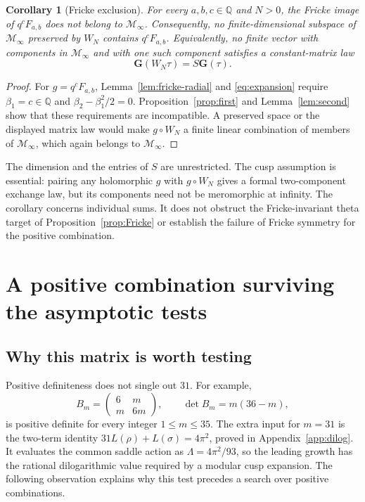 \documentclass[11pt,reqno]{amsart}
\newcommand{\QQ}{\mathbb Q}
\newtheorem{corollary}[theorem]{Corollary}
\theoremstyle{remark}
\numberwithin{equation}{section}
\begin{document}
\begin{corollary}[Fricke exclusion]\label{cor:fricke}
For every $a,b,c\in\QQ$ and $N>0$, the Fricke image of
$q^cF_{a,b}$ does not belong to $\mathcal M_\infty$.
Consequently, no finite-dimensional subspace of $\mathcal M_\infty$
preserved by $W_N$ contains $q^cF_{a,b}$. Equivalently, no finite vector
with components in $\mathcal M_\infty$ and with one such component
satisfies a constant-matrix law
\[
 \mathbf G(W_N\tau)=S\mathbf G(\tau).
\]
\end{corollary}
\begin{proof}
For $g=q^cF_{a,b}$, Lemma~\ref{lem:fricke-radial} and
\eqref{eq:expansion} require $\beta_1=c\in\QQ$ and
$\beta_2-\beta_1^2/2=0$. Proposition~\ref{prop:first} and
Lemma~\ref{lem:second} show that these requirements are incompatible.
A preserved space or the displayed matrix law would make
$g\circ W_N$ a finite linear combination of members of
$\mathcal M_\infty$, which again belongs to $\mathcal M_\infty$.
\end{proof}

The dimension and the entries of $S$ are unrestricted. The cusp
assumption is essential: pairing any holomorphic $g$ with
$g\circ W_N$ gives a formal two-component exchange law, but its
components need not be meromorphic at infinity. The corollary concerns
individual sums. It does not obstruct the Fricke-invariant theta
target of Proposition~\ref{prop:Fricke} or establish the failure of
Fricke symmetry for the positive combination.



\section{A positive combination surviving the asymptotic tests}
\label{sec:combination}
\subsection*{Why this matrix is worth testing}
Positive definiteness does not single out $31$. For example,
\[
 B_m=\begin{pmatrix}6&m\\m&6m\end{pmatrix},\qquad
 \det B_m=m(36-m),
\]
is positive definite for every integer $1\leq m\leq35$.
The extra input for $m=31$ is the two-term identity
$31L(\rho)+L(\sigma)=4\pi^2$, proved in Appendix~\ref{app:dilog}.
It evaluates the common saddle action as $\Lambda=4\pi^2/93$,
so the leading growth has the rational dilogarithmic value required
by a modular cusp expansion. The following observation explains why
this test precedes a search over positive combinations.
\end{document}
